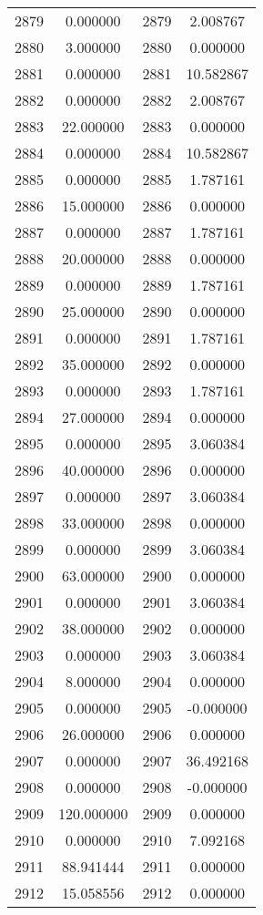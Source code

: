 \documentclass[12pt]{article}
\begin{document}
\begin{longtable}{@{}cccc@{}}
2879 & 0.000000 & 2879 & 2.008767 \\
2880 & 3.000000 & 2880 & 0.000000 \\
2881 & 0.000000 & 2881 & 10.582867 \\
2882 & 0.000000 & 2882 & 2.008767 \\
2883 & 22.000000 & 2883 & 0.000000 \\
2884 & 0.000000 & 2884 & 10.582867 \\
2885 & 0.000000 & 2885 & 1.787161 \\
2886 & 15.000000 & 2886 & 0.000000 \\
2887 & 0.000000 & 2887 & 1.787161 \\
2888 & 20.000000 & 2888 & 0.000000 \\
2889 & 0.000000 & 2889 & 1.787161 \\
2890 & 25.000000 & 2890 & 0.000000 \\
2891 & 0.000000 & 2891 & 1.787161 \\
2892 & 35.000000 & 2892 & 0.000000 \\
2893 & 0.000000 & 2893 & 1.787161 \\
2894 & 27.000000 & 2894 & 0.000000 \\
2895 & 0.000000 & 2895 & 3.060384 \\
2896 & 40.000000 & 2896 & 0.000000 \\
2897 & 0.000000 & 2897 & 3.060384 \\
2898 & 33.000000 & 2898 & 0.000000 \\
2899 & 0.000000 & 2899 & 3.060384 \\
2900 & 63.000000 & 2900 & 0.000000 \\
2901 & 0.000000 & 2901 & 3.060384 \\
2902 & 38.000000 & 2902 & 0.000000 \\
2903 & 0.000000 & 2903 & 3.060384 \\
2904 & 8.000000 & 2904 & 0.000000 \\
2905 & 0.000000 & 2905 & -0.000000 \\
2906 & 26.000000 & 2906 & 0.000000 \\
2907 & 0.000000 & 2907 & 36.492168 \\
2908 & 0.000000 & 2908 & -0.000000 \\
2909 & 120.000000 & 2909 & 0.000000 \\
2910 & 0.000000 & 2910 & 7.092168 \\
2911 & 88.941444 & 2911 & 0.000000 \\
2912 & 15.058556 & 2912 & 0.000000 \\

\end{longtable}
\end{document}
